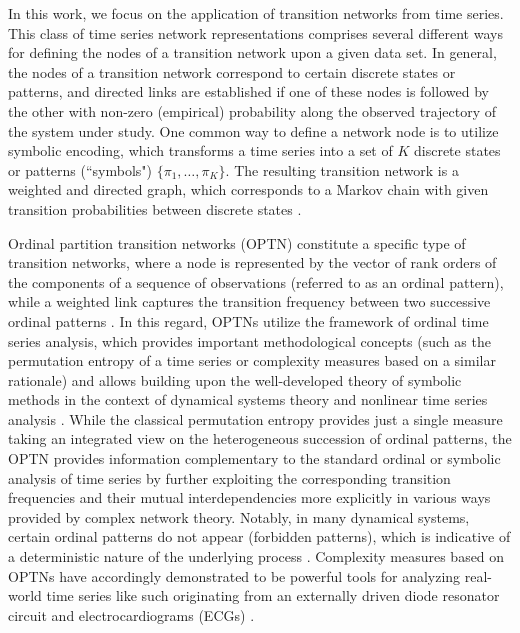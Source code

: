 \documentclass[12pt,aip,cha,reprint,nofootinbib]{revtex4-1}
\begin{document}
In this work, we focus on the application of transition networks from time series. This class of time series network representations comprises several different ways for defining the nodes of a transition network upon a given data set. In general, the nodes of a transition network correspond to certain discrete states or patterns, and directed links are established if one of these nodes is followed by the other with non-zero (empirical) probability along the observed trajectory of the system under study. One common way to define a network node is to utilize  symbolic encoding, which transforms a time series into a set of $K$ discrete states or patterns (``symbols") $\{\pi_1, \dots , \pi_K \}$. The resulting transition network is a weighted and directed graph, which corresponds to a Markov chain with given transition probabilities between discrete states \cite{Schnakenberg1976}.

Ordinal partition transition networks (OPTN) constitute a specific type of transition networks, where a node is represented by the vector of rank orders of the components of a sequence of observations (referred to as an ordinal pattern), while a weighted link captures the transition frequency between two successive ordinal patterns \cite{McCullough2015,KulpChaos2016,KulpChaos2016b,McCulloughChaos2016,SakellariouChaos2016}. In this regard, OPTNs utilize the framework of ordinal time series analysis, which provides important methodological concepts (such as the permutation entropy of a time series \cite{Bandt2002} or complexity measures based on a similar rationale) and allows building upon the well-developed theory of symbolic methods in the context of dynamical systems theory and nonlinear time series analysis \cite{Daw2003,Finn2003,Amigo2010}. While the classical permutation entropy provides just a single measure taking an integrated view on the heterogeneous succession of ordinal patterns, the OPTN \cite{McCullough2015,KulpChaos2016,McCullough2017b} provides information complementary to the standard ordinal or symbolic analysis of time series by further exploiting the corresponding transition frequencies and their mutual interdependencies more explicitly in various ways provided by complex network theory. Notably, in many dynamical systems, certain ordinal patterns do not appear (forbidden patterns), which is indicative of a deterministic nature of the underlying process \cite{KulpChaos2016b,McCulloughChaos2016,SakellariouChaos2016}. Complexity measures based on OPTNs have accordingly demonstrated to be powerful tools for analyzing real-world time series like such originating from an externally driven diode resonator circuit \cite{McCullough2015} and electrocardiograms (ECGs) \cite{McCullough2017b}.
\end{document}
